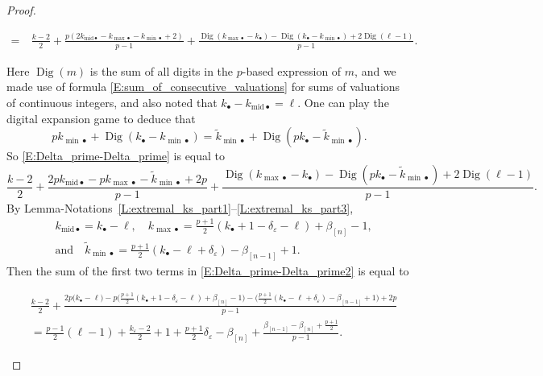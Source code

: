 \begin{proof}
\begin{small}
\begin{align}
    =\ & \frac{k-2}2+ \frac {p(2k_{{\mathrm{mid}}\bullet}- k_{{\max}\bullet}- k_{{\min}\bullet}+2)}{p-1}+ \frac{{\operatorname{Dig}}(k_{{\max}\bullet} - k_{\bullet})- {\operatorname{Dig}}(k_{\bullet} - k_{{\min}\bullet})+2{\operatorname{Dig}}(\ell-1)}{p-1}.
    \end{align}\end{small}
    Here ${\operatorname{Dig}}(m)$ is the sum of all digits in the $p$-based expression of $m$, and we made use of formula \eqref{E:sum_of_consecutive_valuations} for sums of valuations of continuous integers, and also noted that $k_\bullet - k_{{\mathrm{mid}}\bullet} = \ell$.
    One can play the digital expansion game to deduce that
    \begin{equation}
    \label{E:digital_expansion_game}
    pk_{{\min}\bullet}+ {\operatorname{Dig}}(k_{\bullet} - k_{{\min}\bullet}) = \tilde k_{{\min}\bullet}+ {\operatorname{Dig}}(pk_{\bullet} - \tilde k_{{\min}\bullet}).
    \end{equation}
    So \eqref{E:Delta_prime-Delta_prime} is equal to \begin{equation}
    \label{E:Delta_prime-Delta_prime2}
    \frac{k-2}2+ \frac {2pk_{{\mathrm{mid}}\bullet}-p k_{{\max}\bullet}- \tilde k_{{\min}\bullet}+2p}{p-1}+\frac{{\operatorname{Dig}}(k_{{\max}\bullet} - k_{\bullet})- {\operatorname{Dig}}(pk_{\bullet} - \tilde  k_{{\min}\bullet})+2{\operatorname{Dig}}(\ell-1)}{p-1}.
    \end{equation}
    By Lemma-Notations~\ref{L:extremal_ks_part1}--\ref{L:extremal_ks_part3},
    \begin{align*}
    &k_{{\mathrm{mid}}\bullet} =k_{\bullet} -\ell, \quad k_{{\max}\bullet} =\tfrac {p+1}2 (k_{\bullet}+1-\delta_\varepsilon -\ell) + \beta_{[n]}-1,
    \\
    & \textrm{and} \quad \tilde k_{{\min}\bullet}  =  \tfrac{p+1}2 (k_{\bullet}-\ell+\delta_\varepsilon) - \beta_{[n-1]}+1.
    \end{align*}
    Then the sum of the first two terms in \eqref{E:Delta_prime-Delta_prime2} is equal to
    \begin{small}
    \begin{align*}
    &\frac{k-2}2 +
    \frac{2 p\big( k_\bullet -\ell\big)  -p \big(\tfrac{p+1}2(k_\bullet+1 - \delta_\varepsilon -\ell) + \beta_{[n]}-1\big)
    - \big(\tfrac{p+1}2(k_\bullet - \ell+ \delta_\varepsilon) - \beta_{[n-1]}+1 \big)+2p}{p-1}
    \\
    &= \frac{p-1}2 (\ell-1)+ \frac{k_\varepsilon - 2}2+1+\frac{p+1}2 \delta_\varepsilon -\beta_{[n]}+ \frac{\beta_{[n-1]}-\beta_{[n]}+\frac{p+1}2}{p-1}.

\end{align*}
\end{small}
\end{proof}
